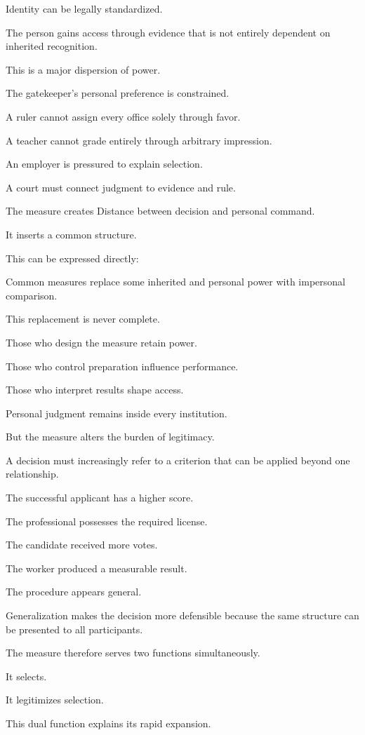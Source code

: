 Identity can be legally standardized.

The person gains access through evidence that is not entirely dependent on inherited recognition.

This is a major dispersion of power.

The gatekeeper’s personal preference is constrained.

A ruler cannot assign every office solely through favor.

A teacher cannot grade entirely through arbitrary impression.

An employer is pressured to explain selection.

A court must connect judgment to evidence and rule.

The measure creates Distance between decision and personal command.

It inserts a common structure.

This can be expressed directly:

Common measures replace some inherited and personal power with impersonal comparison.

This replacement is never complete.

Those who design the measure retain power.

Those who control preparation influence performance.

Those who interpret results shape access.

Personal judgment remains inside every institution.

But the measure alters the burden of legitimacy.

A decision must increasingly refer to a criterion that can be applied beyond one relationship.

The successful applicant has a higher score.

The professional possesses the required license.

The candidate received more votes.

The worker produced a measurable result.

The procedure appears general.

Generalization makes the decision more defensible because the same structure can be presented to all participants.

The measure therefore serves two functions simultaneously.

It selects.

It legitimizes selection.

This dual function explains its rapid expansion.

